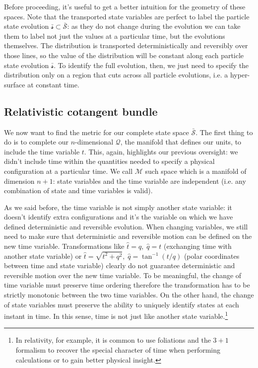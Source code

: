 \documentclass[aps,pra,10pt,twocolumn,floatfix,nofootinbib]{revtex4-1}
\numberwithin{equation}{section}
\theoremstyle{definition}
\begin{document}
Before proceeding, it's useful to get a better intuition for the geometry of these spaces. Note that the transported state variables are perfect to label the particle state evolution $\bar{\mathcal{s}} \subset \bar{\mathcal{S}}$: as they do not change during the evolution we can take them to label not just the values at a particular time, but the evolutions themselves. The distribution is transported deterministically and reversibly over those lines, so the value of the distribution will be constant along each particle state evolution $\bar{\mathcal{s}}$. To identify the full evolution, then, we just need to specify the distribution only on a region that cuts across all particle evolutions, i.e. a hyper-surface at constant time.


\subsection{Relativistic cotangent bundle}

We now want to find the metric for our complete state space $\bar{\mathcal{S}}$. The first thing to do is to complete our $n$-dimensional $\mathcal{Q}$, the manifold that defines our units, to include the time variable $t$. This, again, highlights our previous oversight: we didn't include time within the quantities needed to specify a physical configuration at a particular time. We call $\mathcal{M}$ such space which is a manifold of dimension $n+1$: state variables and the time variable are independent (i.e. any combination of state and time variables is valid).

As we said before, the time variable is not simply another state variable: it doesn't identify extra configurations and it's the variable on which we have defined deterministic and reversible evolution. When changing variables, we still need to make sure that deterministic and reversible motion can be defined on the new time variable. Transformations like $\hat{t}=q, \; \hat{q}=t$ (exchanging time with another state variable) or $\hat{t}=\sqrt{t^2 + q^2}, \; \hat{q}=\tan^{-1}(t/q)$ (polar coordinates between time and state variable) clearly do not guarantee deterministic and reversible motion over the new time variable. To be meaningful, the change of time variable must preserve time ordering therefore the transformation has to be strictly monotonic between the two time variables. On the other hand, the change of state variables must preserve the ability to uniquely identify states at each instant in time. In this sense, time is not just like another state variable.\footnote{In relativity, for example, it is common to use foliations and the $3+1$ formalism to recover the special character of time when performing calculations or to gain better physical insight.}
\end{document}
